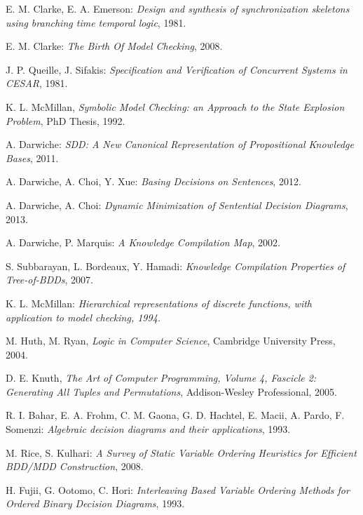 \documentclass[11pt]{article}
\begin{document}
\begin{thebibliography}{9}

 E. M. Clarke, E. A. Emerson: \textit{Design and synthesis of synchronization skeletons using branching time temporal logic}, 1981.

 E. M. Clarke: \textit{The Birth Of Model Checking}, 2008.

 J. P. Queille, J. Sifakis: \textit{Specification and Verification of Concurrent Systems in CESAR}, 1981.

 K. L. McMillan, \textit{Symbolic Model Checking: an Approach to the State Explosion Problem}, PhD Thesis, 1992. 


A. Darwiche:\emph{ SDD: A New Canonical Representation of Propositional Knowledge Bases}, 2011.

A. Darwiche, A. Choi, Y. Xue: \emph{Basing Decisions on Sentences}, 2012.

A. Darwiche, A. Choi: \textit{Dynamic Minimization of Sentential Decision Diagrams}, 2013.

  A. Darwiche, P. Marquis:
  \emph{A Knowledge Compilation Map}, 2002.

S. Subbarayan, L. Bordeaux, Y. Hamadi:\textit{
Knowledge Compilation Properties of Tree-of-BDDs}, 2007.

K. L. McMillan:\textit{ Hierarchical representations of discrete functions, with application to model checking, 1994.
}

 M. Huth, M. Ryan, 
\emph{Logic in Computer Science},
Cambridge University Press, 2004.

 D. E. Knuth, \textit{The Art of Computer Programming, Volume
4, Fascicle 2: Generating All Tuples and Permutations}, Addison-Wesley Professional, 2005.

  R. I. Bahar, E. A. Frohm, C. M. Gaona, G. D. Hachtel, E. Macii, A. Pardo, F. Somenzi:\textit{
Algebraic decision diagrams and their applications}, 1993.

 M. Rice, S. Kulhari:\textit{ A Survey of Static Variable Ordering Heuristics for Efficient BDD/MDD Construction}, 2008.

 H. Fujii, G. Ootomo, C. Hori: \textit{Interleaving Based Variable Ordering Methods for Ordered Binary Decision Diagrams}, 1993.


\end{thebibliography}
\end{document}

